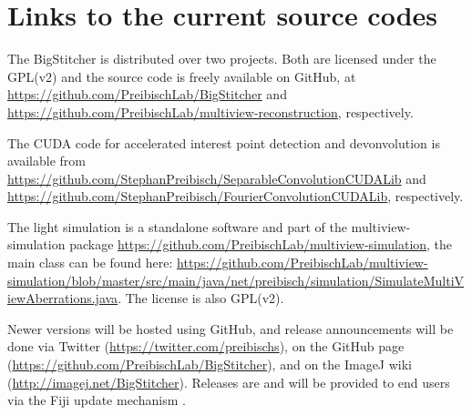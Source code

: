 
\section{Links to the current source codes}
\label{sec:currentcode}

The BigStitcher is distributed over two projects. Both are licensed under the GPL(v2) and the source code is freely available on GitHub, at \url{https://github.com/PreibischLab/BigStitcher} and \url{https://github.com/PreibischLab/multiview-reconstruction}, respectively.

The CUDA code for accelerated interest point detection and devonvolution is available from \url{https://github.com/StephanPreibisch/SeparableConvolutionCUDALib} and \url{https://github.com/StephanPreibisch/FourierConvolutionCUDALib}, respectively.

The light simulation is a standalone software and part of the multiview-simulation package \url{https://github.com/PreibischLab/multiview-simulation}, the main class can be found here: \url{https://github.com/PreibischLab/multiview-simulation/blob/master/src/main/java/net/preibisch/simulation/SimulateMultiViewAberrations.java}. The license is also GPL(v2).

Newer versions will be hosted using GitHub, and release announcements will be done via Twitter (\url{https://twitter.com/preibischs}), on the GitHub page (\url{https://github.com/PreibischLab/BigStitcher}), and on the ImageJ wiki (\url{http://imagej.net/BigStitcher}). Releases are and will be provided to end users via the Fiji update mechanism \cite{imagej}.